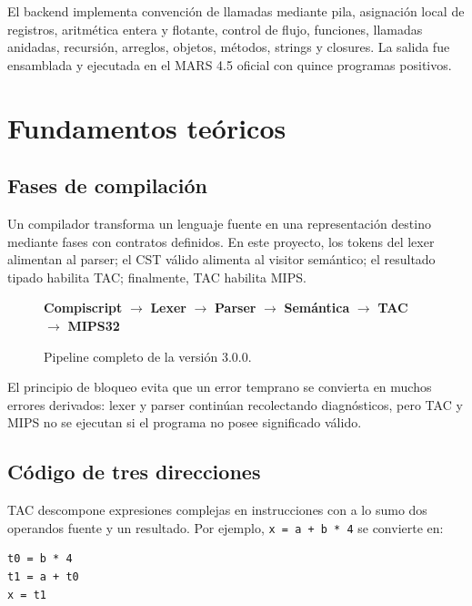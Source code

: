 \documentclass[11pt,letterpaper,oneside]{report}
\newcommand{\codigo}[1]{\texttt{#1}}
\begin{document}
El backend implementa convenci\'on de llamadas mediante pila, asignaci\'on local de registros, aritm\'etica entera y flotante, control de flujo, funciones, llamadas anidadas, recursi\'on, arreglos, objetos, m\'etodos, strings y closures. La salida fue ensamblada y ejecutada en el MARS 4.5 oficial con quince programas positivos.

\chapter{Fundamentos te\'oricos}

\section{Fases de compilaci\'on}

Un compilador transforma un lenguaje fuente en una representaci\'on destino mediante fases con contratos definidos. En este proyecto, los tokens del lexer alimentan al parser; el CST v\'alido alimenta al visitor sem\'antico; el resultado tipado habilita TAC; finalmente, TAC habilita MIPS.

\begin{figure}[ht]
\centering
\small
\setlength{\fboxsep}{5pt}
\colorbox{amarillo}{\textbf{Compiscript}} $\longrightarrow$
\colorbox{amarillo}{\textbf{Lexer}} $\longrightarrow$
\colorbox{amarillo}{\textbf{Parser}} $\longrightarrow$
\colorbox{amarillo}{\textbf{Sem\'antica}} $\longrightarrow$
\colorbox{amarillo}{\textbf{TAC}} $\longrightarrow$
\colorbox{verde}{\textbf{MIPS32}}
\caption{Pipeline completo de la versi\'on 3.0.0.}
\end{figure}

El principio de bloqueo evita que un error temprano se convierta en muchos errores derivados: lexer y parser contin\'uan recolectando diagn\'osticos, pero TAC y MIPS no se ejecutan si el programa no posee significado v\'alido.

\section{C\'odigo de tres direcciones}

TAC descompone expresiones complejas en instrucciones con a lo sumo dos operandos fuente y un resultado. Por ejemplo, \codigo{x = a + b * 4} se convierte en:

\begin{verbatim}
t0 = b * 4
t1 = a + t0
x = t1
\end{verbatim}
\end{document}
